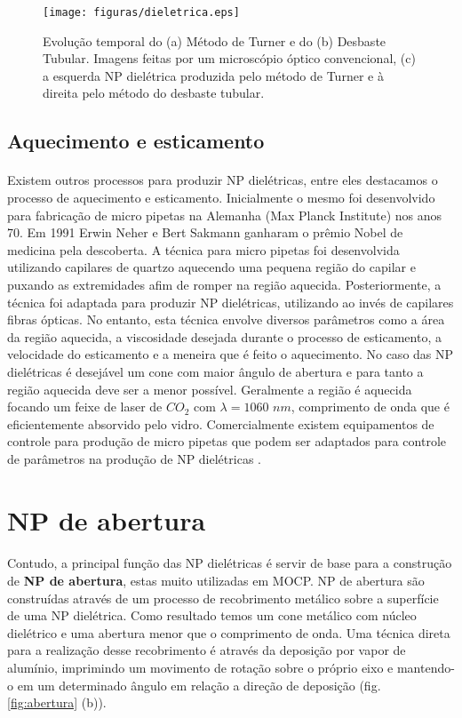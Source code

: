 \begin{figure}[h]
\centering
\texttt{[image: figuras/dieletrica.eps]}
\caption{Evolução temporal do (a) Método de Turner e do (b) Desbaste Tubular. Imagens feitas por um microscópio óptico convencional, (c) a esquerda NP dielétrica produzida pelo método de Turner e à direita pelo método do desbaste tubular.  \cite{principle}}
\label{fig:desbaste_quimico}
\end{figure} 

\subsection{Aquecimento e esticamento}
\paragraph*{}

Existem outros processos para produzir NP dielétricas, entre eles destacamos o processo de aquecimento e esticamento. Inicialmente o mesmo foi desenvolvido para fabricação de micro pipetas na Alemanha (Max Planck Institute) nos anos 70. Em 1991 Erwin Neher e Bert Sakmann ganharam o prêmio Nobel de medicina pela descoberta. A técnica para micro pipetas foi desenvolvida utilizando capilares de quartzo aquecendo uma pequena região do capilar e puxando as extremidades afim de romper na região aquecida. Posteriormente, a técnica foi adaptada para produzir NP dielétricas, utilizando ao invés de capilares fibras ópticas. No entanto, esta técnica envolve diversos parâmetros como a área da região aquecida, a viscosidade desejada durante o processo de esticamento, a velocidade do esticamento e a meneira que é feito o aquecimento. No caso das NP dielétricas é desejável um cone com maior ângulo de abertura e para tanto a região aquecida deve ser a menor possível. Geralmente a região é aquecida focando um feixe de laser de $CO_2$ com $\lambda = 1060 \,\,nm$, comprimento de onda que é eficientemente absorvido pelo vidro. Comercialmente existem equipamentos de controle para produção de micro pipetas que podem ser adaptados para controle de parâmetros na produção de NP dielétricas \cite{principle}. 

\section{NP de abertura}
\paragraph*{}
Contudo, a principal função das NP dielétricas é servir de base para a construção de \textbf{NP de abertura}, estas muito utilizadas em MOCP. NP de abertura são construídas através de um processo de recobrimento metálico sobre a superfície de uma NP dielétrica. Como resultado temos um cone metálico com núcleo dielétrico e uma abertura menor que o comprimento de onda. Uma técnica direta para a realização desse recobrimento é através da deposição por vapor de alumínio, imprimindo um movimento de rotação sobre o próprio eixo e mantendo-o em um determinado ângulo em relação a direção de deposição (fig. \ref{fig:abertura} (b)). 

